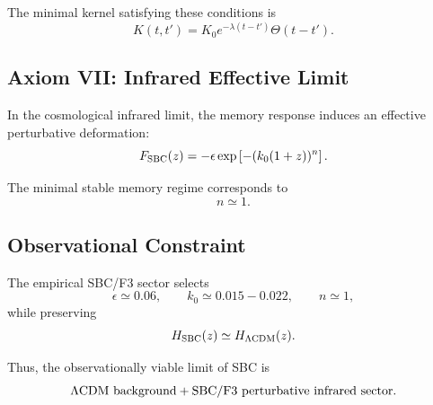 The minimal kernel satisfying these conditions is
\begin{equation}
K(t,t')
=
K_0 e^{-\lambda(t-t')}
\Theta(t-t').
\end{equation}

\subsection{Axiom VII: Infrared Effective Limit}

In the cosmological infrared limit, the memory response induces an effective perturbative deformation:
\begin{equation}
F_{\rm SBC}(z)
=
-\epsilon
\exp\left[-(k_0(1+z))^n\right].
\end{equation}

The minimal stable memory regime corresponds to
\begin{equation}
n\simeq 1.
\end{equation}

\subsection{Observational Constraint}

The empirical SBC/F3 sector selects
\begin{equation}
\epsilon\simeq 0.06,
\qquad
k_0\simeq 0.015-0.022,
\qquad
n\simeq 1,
\end{equation}
while preserving
\begin{equation}
H_{\rm SBC}(z)
\simeq
H_{\Lambda{\rm CDM}}(z).
\end{equation}

Thus, the observationally viable limit of SBC is
\begin{equation}
\Lambda{\rm CDM\ background}
+
{\rm SBC/F3\ perturbative\ infrared\ sector}.
\end{equation}
